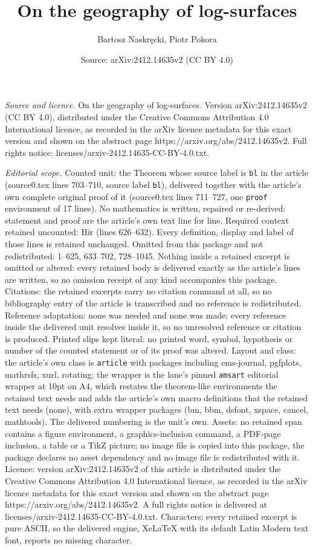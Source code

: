 \documentclass[10pt,a4paper]{amsart}
\title[On the geography of log-surfaces]{On the geography of log-surfaces}
\author{Bartosz Naskr\k{e}cki, Piotr Pokora}
\date{Source: arXiv:2412.14635v2 (CC BY 4.0)}
\begin{document}
\maketitle

\noindent\emph{Source and licence.} On the geography of log-surfaces. Version arXiv:2412.14635v2 (CC BY 4.0), distributed under the Creative Commons Attribution 4.0 International licence, as recorded in the arXiv licence metadata for this exact version and shown on the abstract page https://arxiv.org/abs/2412.14635v2. Full rights notice: licenses/arxiv-2412.14635-CC-BY-4.0.txt.\par\smallskip

\noindent\textit{Editorial scope.} Counted unit: the Theorem whose source label is \texttt{bl} in the article (source0.tex lines 703--710, source label \texttt{bl}), delivered together with the article's own complete original proof of it (source0.tex lines 711--727, one \texttt{proof} environment of 17 lines). No mathematics is written, repaired or re-derived: statement and proof are the article's own text line for line. Required context retained uncounted: Hir (lines 626--632). Every definition, display and label of those lines is retained unchanged. Omitted from this package and not redistributed: 1--625, 633--702, 728--1045. Nothing inside a retained excerpt is omitted or altered: every retained body is delivered exactly as the article's lines are written, so no omission receipt of any kind accompanies this package. Citations: the retained excerpts carry no citation command at all, so no bibliography entry of the article is transcribed and no reference is redistributed. Reference adaptation: none was needed and none was made; every reference inside the delivered unit resolves inside it, so no unresolved reference or citation is produced. Printed slips kept literal: no printed word, symbol, hypothesis or number of the counted statement or of its proof was altered. Layout and class: the article's own class is \texttt{article} with packages including ems-journal, pgfplots, mathrsfs, xurl, rotating; the wrapper is the lane's pinned \texttt{amsart} editorial wrapper at 10pt on A4, which restates the theorem-like environments the retained text needs and adds the article's own macro definitions that the retained text needs (none), with extra wrapper packages (bm, bbm, dsfont, xspace, cancel, mathtools). The delivered numbering is the unit's own. Assets: no retained span contains a figure environment, a graphics-inclusion command, a PDF-page inclusion, a table or a TikZ picture; no image file is copied into this package, the package declares no asset dependency and no image file is redistributed with it. Licence: version arXiv:2412.14635v2 of this article is distributed under the Creative Commons Attribution 4.0 International licence, as recorded in the arXiv licence metadata for this exact version and shown on the abstract page https://arxiv.org/abs/2412.14635v2. A full rights notice is delivered at licenses/arxiv-2412.14635-CC-BY-4.0.txt. Characters: every retained excerpt is pure ASCII, so the delivered engine, XeLaTeX with its default Latin Modern text font, reports no missing character.
\end{document}
